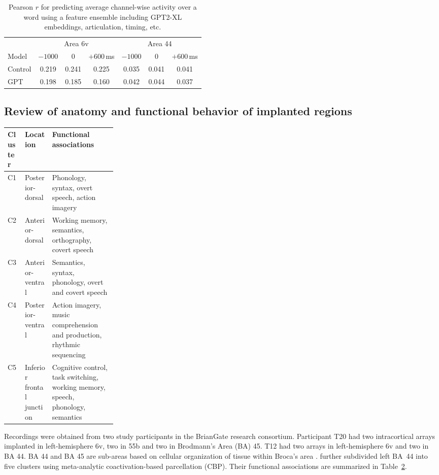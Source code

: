 \documentclass[11pt]{article}
\begin{document}
\begin{table}[h]
\centering
\label{tab:lagged}
\begin{tabular}{lcccccc}
\toprule
 & \multicolumn{3}{c}{Area 6v} & \multicolumn{3}{c}{Area 44} \\
\cmidrule(lr){2-4}\cmidrule(lr){5-7}
Model & $-1000$ & $0$ & $+600$\,ms & $-1000$ & $0$ & $+600$\,ms \\
\midrule
Control & 0.219 & 0.241 & 0.225 & 0.035 & 0.041 & 0.041 \\
GPT & 0.198 & 0.185 & 0.160 & 0.042 & 0.044 & 0.037 \\
\bottomrule
\end{tabular}
\caption{Pearson $r$ for predicting average channel-wise activity over a word using a feature ensemble including GPT2-XL embeddings, articulation, timing, etc.}
\end{table}

\subsection{Review of anatomy and functional behavior of implanted regions}

\begin{table}
    \centering
    \small
    \setlength{\tabcolsep}{3pt}
    \renewcommand{\arraystretch}{1.15}
    \vspace{-.4cm}
    \label{tab:ba44-clusters}
    \begin{tabularx}{\linewidth}{
        @{}l
        >{\raggedright\arraybackslash}p{0.25\linewidth}
        >{\raggedright\arraybackslash}X@{}
    }
        \toprule
        Cluster & Location & Functional associations \\
        \midrule
        C1 & Posterior-dorsal &
        Phonology, syntax, overt speech, action imagery \\
        C2 & Anterior-dorsal &
        Working memory, semantics, orthography, covert speech \\
        C3 & Anterior-ventral &
        Semantics, syntax, phonology, overt and covert speech \\
        C4 & Posterior-ventral &
        Action imagery, music comprehension and production,
        rhythmic sequencing \\
        C5 & Inferior frontal junction &
        Cognitive control, task switching, working memory,
        speech, phonology, semantics \\
        \bottomrule
    \end{tabularx}
\end{table}

Recordings were obtained from two study participants in the BrianGate research consortium. Participant T20 had two intracortical arrays implanted in left-hemisphere 6v, two in 55b and two in Brodmann's Area (BA) 45. T12 had two arrays in left-hemisphere 6v and two in BA 44. BA 44 and BA 45 are sub-areas based on cellular organization of tissue within Broca's area \cite{brodmann1909vergleichende}. \citet{clos2013tackling} further subdivided left BA~44 into five
clusters using meta-analytic coactivation-based parcellation (CBP).
Their functional associations are summarized in
Table~\ref{tab:ba44-clusters}.
\end{document}
